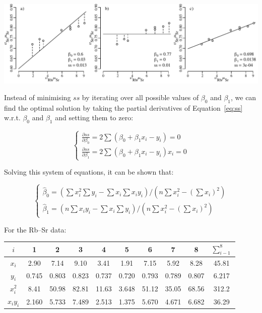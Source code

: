 \noindent\includegraphics[width=\textwidth]{../figures/tryRbSr.pdf}
\begingroup {} \endgroup

Instead of minimising $ss$ by iterating over all possible values of
$\beta_0$ and $\beta_1$, we can find the optimal solution by taking
the partial derivatives of Equation~\ref{eq:ss} w.r.t. $\beta_0$ and
$\beta_1$ and setting them to zero:

\begin{equation}
\begin{cases}
    \frac{\partial ss}{\partial\beta_0} = 2 \sum(\beta_0 + \beta_1 x_i - y_i) = 0\\
    \frac{\partial ss}{\partial\beta_1} = 2 \sum(\beta_0 + \beta_1 x_i - y_i) x_i = 0
\end{cases}
\end{equation}

Solving this system of equations, it can be shown that:

\begin{equation}
\begin{cases}
  \hat{\beta}_0 = \left(\sum x_i^2 \sum y_i - \sum x_i \sum x_iy_i\right) /
  \left(n \sum x_i^2 - \left(\sum x_i\right)^2\right)\\
  \hat{\beta}_1 = \left(n\sum x_iy_i - \sum x_i \sum y_i \right) /
  \left(n \sum x_i^2 - \left(\sum x_i\right)^2\right)
\end{cases}
\label{eq:fitab}
\end{equation}

For the Rb--Sr data:

\begin{center}
  \begin{tabular}{c|cccccccc|c}
    $i$ & 1 & 2 & 3 & 4 & 5 & 6 & 7 & 8 & $\sum_{i-1}^{8}$ \\ \hline
    $x_i$ & 2.90 & 7.14 & 9.10 & 3.41 & 1.91 & 7.15 & 5.92 & 8.28 & 45.81 \\
    $y_i$ & 0.745 & 0.803 & 0.823 & 0.737 & 0.720 &
    0.793 & 0.789 & 0.807 & 6.217\\ \hline
    $x_i^2$ & 8.41 & 50.98 & 82.81 & 11.63 & 3.648 &
    51.12 & 35.05 & 68.56 & 312.2 \\
    $x_iy_i$ & 2.160 & 5.733 & 7.489 & 2.513 & 1.375 &
    5.670 & 4.671 & 6.682 & 36.29
  \end{tabular}
\end{center}

